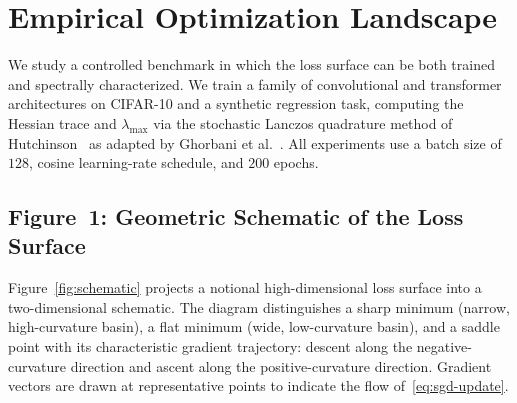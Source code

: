 \documentclass[twocolumn,10pt]{article}
\begin{document}
\section{Empirical Optimization Landscape}
\label{sec:empirical}

We study a controlled benchmark in which the loss surface can be both trained and spectrally characterized. We train a family of convolutional and transformer architectures on CIFAR-10 and a synthetic regression task, computing the Hessian trace and $\lambda_{\max}$ via the stochastic Lanczos quadrature method of Hutchinson~\cite{hutchinson1990stochastic} as adapted by Ghorbani et al.~\cite{ghorbani2019investigation}. All experiments use a batch size of $128$, cosine learning-rate schedule, and $200$ epochs.

\subsection{Figure~1: Geometric Schematic of the Loss Surface}

Figure~\ref{fig:schematic} projects a notional high-dimensional loss surface into a two-dimensional schematic. The diagram distinguishes a sharp minimum (narrow, high-curvature basin), a flat minimum (wide, low-curvature basin), and a saddle point with its characteristic gradient trajectory: descent along the negative-curvature direction and ascent along the positive-curvature direction. Gradient vectors are drawn at representative points to indicate the flow of~\eqref{eq:sgd-update}.
\end{document}
